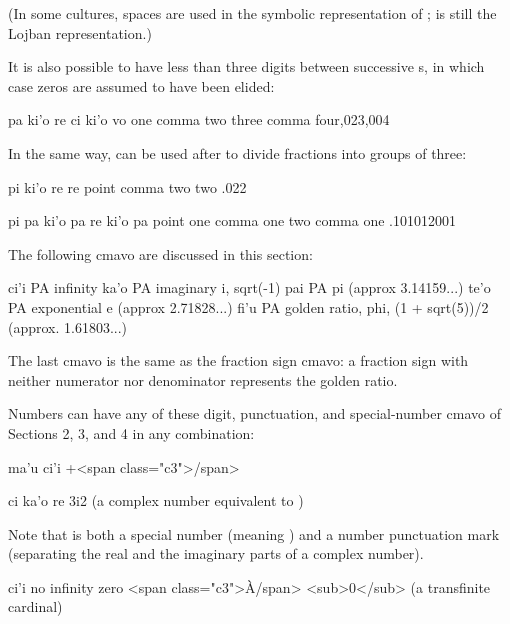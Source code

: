 (In some cultures, spaces are used in the symbolic
    representation of ;  is
    still the Lojban representation.) 

It is also possible to have less than three digits between
    successive s, in which case zeros are assumed to have
    been elided:
\begin{example}
pa ki'o re ci ki'o vo\n
one comma two three comma four,023,004
\end{example}

In the same way,  can be used after  to divide
    fractions into groups of three:
\begin{example}
pi ki'o re re\n
point comma two two\n
.022
\end{example}

\begin{example}
pi pa ki'o pa re ki'o pa\n
point one comma one two comma one\n
.101012001
\end{example}



The following cmavo are discussed in this section:

   ci'i    PA  infinity
    ka'o    PA  imaginary i, sqrt(-1)
    pai PA  pi (approx 3.14159...)
    te'o    PA  exponential e (approx 2.71828...)
    fi'u    PA  golden ratio, phi,
            (1 + sqrt(5))/2 (approx. 1.61803...)

The last cmavo is the same as the fraction sign cmavo: a
    fraction sign with neither numerator nor denominator represents
    the golden ratio. 

Numbers can have any of these digit, punctuation, and
    special-number cmavo of Sections 2, 3, and 4 in any
    combination:
\begin{example}
ma'u ci'i\n
+<span class="c3">\textyen/span>
\end{example}

\begin{example}
ci ka'o re\n
3i2 (a complex number equivalent to )
\end{example}

Note that  is both a special number (meaning ) and
    a number punctuation mark (separating the real and the
    imaginary parts of a complex number).
\begin{example}
ci'i no\n
infinity zero\n
<span class="c3">\`{A}/span>
<sub>0</sub> (a transfinite cardinal)
\end{example}

